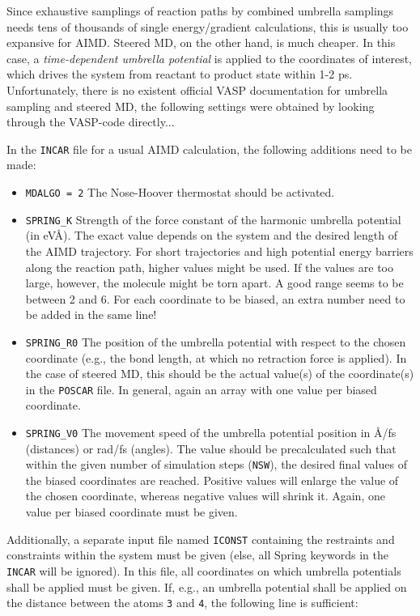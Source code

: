 \documentclass[a4paper,11pt]{article}
\begin{document}
Since exhaustive samplings of reaction paths by combined umbrella samplings needs tens of
thousands of single energy/gradient calculations, this is usually too expansive for
AIMD. Steered MD, on the other hand, is much cheaper.
In this case, a \textit{time-dependent umbrella potential} is applied to the coordinates
of interest, which drives the system from reactant to product state within 1-2 ps.
Unfortunately, there is no existent official VASP documentation for umbrella sampling and
steered MD, the following settings were obtained by looking through the VASP-code directly...

In the \texttt{INCAR} file for a usual AIMD calculation, the following additions need to
be made:

\begin{itemize}
 \item \texttt{MDALGO = 2} The Nose-Hoover thermostat should be activated.
 \item \texttt{SPRING\_K} Strength of the force constant of the harmonic umbrella potential (in eV\AA). The exact value depends
 on the system and the desired length of the AIMD trajectory. For short trajectories and high potential
 energy barriers along the reaction path, higher values might be used. If the values are too large, however,
 the molecule might be torn apart. A good range seems to be between 2 and 6.
 For each coordinate to be biased, an extra number need to be added in the same line!
 \item \texttt{SPRING\_R0} The position of the umbrella potential with respect to the chosen coordinate (e.g., the bond
 length, at which no retraction force is applied). In the case of steered MD, this should be the actual value(s)
 of the coordinate(s) in the \texttt{POSCAR} file. In general, again an array with one value per biased coordinate.
 \item \texttt{SPRING\_V0} The movement speed of the umbrella potential position in \AA/fs (distances) or rad/fs (angles).
 The value should be precalculated such that within the given number of simulation steps (\texttt{NSW}), the desired
 final values of the biased coordinates are reached. Positive values will enlarge the value of the chosen coordinate,
 whereas negative values will shrink it. Again, one value per biased coordinate must be given.
\end{itemize}

Additionally, a separate input file named \texttt{ICONST} containing the restraints and constraints within the
system must be given (else, all Spring keywords in the \texttt{INCAR} will be ignored).
In this file, all coordinates on which umbrella potentials shall be applied must be given.
If, e.g., an umbrella potential shall be applied on the distance between the atoms \texttt{3} and \texttt{4}, the following
line is sufficient:
\end{document}
